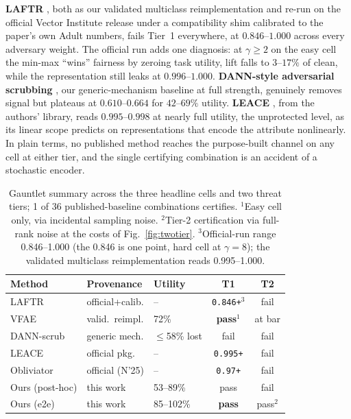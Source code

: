 \documentclass[letterpaper]{article} %
\begin{document}
\textbf{LAFTR} \citep{madras2018laftr}, both as our validated multiclass
reimplementation and re-run on the official Vector Institute release
under a compatibility shim calibrated to the paper's own Adult numbers,
fails Tier~1 everywhere, at $0.846$--$1.000$ across every adversary
weight. The official run adds one diagnosis: at $\gamma \ge 2$ on the
easy cell the min-max ``wins'' fairness by zeroing task utility, lift
falls to $3$--$17\%$ of clean, while the representation still leaks at
$0.996$--$1.000$. \textbf{DANN-style adversarial scrubbing}
\citep{ganin2015dann}, our generic-mechanism baseline at full strength,
genuinely removes signal but plateaus at $0.610$--$0.664$ for
$42$--$69\%$ utility. \textbf{LEACE} \citep{belrose2023leace}, from the
authors' library, reads $0.995$--$0.998$ at nearly full utility, the
unprotected level, as its linear scope predicts on representations that
encode the attribute nonlinearly. In plain terms, no published method
reaches the purpose-built channel on any cell at either tier, and the
single certifying combination is an accident of a stochastic encoder.

\begin{table}[t]
\centering
\footnotesize
\setlength{\tabcolsep}{3.5pt}
\begin{tabular}{@{}lllcc@{}}
\toprule
Method & Provenance & Utility & T1 & T2 \\
\midrule
LAFTR & official+calib. & -- & \texttt{0.846+}$^{3}$ & fail \\
VFAE & valid.\ reimpl. & 72\% & \textbf{pass}$^{1}$ & at bar \\
DANN-scrub & generic mech. & $\le$58\% lost & fail & fail \\
LEACE & official pkg. & -- & \texttt{0.995+} & fail \\
Obliviator & official (N'25) & -- & \texttt{0.97+} & fail \\
\midrule
Ours (post-hoc) & this work & 53--89\% & pass & fail \\
Ours (e2e) & this work & 85--102\% & \textbf{pass} & pass$^{2}$ \\
\bottomrule
\end{tabular}
\caption{%
Gauntlet summary across the three headline cells and two threat tiers; 1 of 36 published-baseline combinations certifies. $^{1}$Easy cell only, via incidental sampling noise. $^{2}$Tier-2 certification via full-rank noise at the costs of Fig.~\ref{fig:twotier}. $^{3}$Official-run range 0.846--1.000 (the 0.846 is one point, hard cell at $\gamma{=}8$); the validated multiclass reimplementation reads 0.995--1.000.}
\label{tab:gauntlet}
\end{table}
\end{document}
